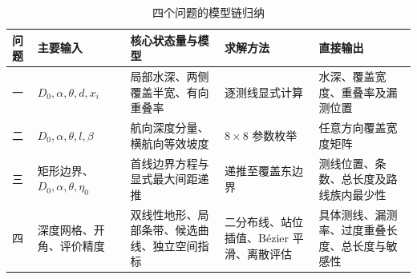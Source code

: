 \begin{table}[H]
\centering
\caption{四个问题的模型链归纳}
\label{tab:model-chain}
\begin{tabularx}{\textwidth}{C{1.2cm}C{3.0cm}C{3.3cm}C{3.2cm}L}
\toprule
问题 & 主要输入 & 核心状态量与模型 & 求解方法 & 直接输出 \\
\midrule
一 & $D_0,\alpha,\theta,d,x_i$ & 局部水深、两侧覆盖半宽、有向重叠率 & 逐测线显式计算 & 水深、覆盖宽度、重叠率及漏测位置 \\
二 & $D_0,\alpha,\theta,l,\beta$ & 航向深度分量、横航向等效坡度 & $8\times8$ 参数枚举 & 任意方向覆盖宽度矩阵 \\
三 & 矩形边界、$D_0,\alpha,\theta,\eta_0$ & 首线边界方程与显式最大间距递推 & 递推至覆盖东边界 & 测线位置、条数、总长度及路线族内最少性 \\
四 & 深度网格、开角、评价精度 & 双线性地形、局部条带、候选曲线、独立空间指标 & 二分布线、站位插值、Bézier 平滑、离散评估 & 具体测线、漏测率、过度重叠长度、总长度与敏感性 \\
\bottomrule
\end{tabularx}
\end{table}
